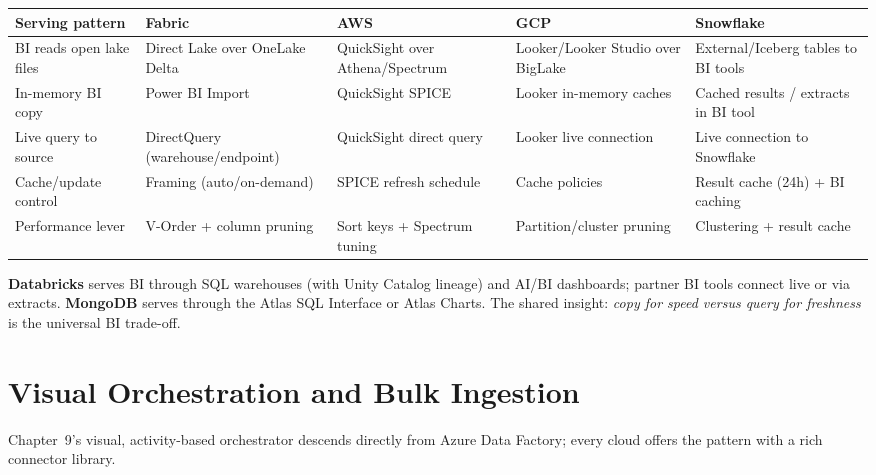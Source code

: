 \begin{center}
\footnotesize
\begin{tabular}{@{}p{2.8cm}p{3.2cm}p{3.2cm}p{3.2cm}p{3.2cm}@{}}
\toprule
\textbf{Serving pattern} & \textbf{Fabric} & \textbf{AWS} & \textbf{GCP} & \textbf{Snowflake} \\
\midrule
BI reads open lake files & Direct Lake over OneLake Delta & QuickSight over Athena/Spectrum & Looker/Looker Studio over BigLake & External/Iceberg tables to BI tools \\
In-memory BI copy & Power BI Import & QuickSight SPICE & Looker in-memory caches & Cached results / extracts in BI tool \\
Live query to source & DirectQuery (warehouse/endpoint) & QuickSight direct query & Looker live connection & Live connection to Snowflake \\
Cache/update control & Framing (auto/on-demand) & SPICE refresh schedule & Cache policies & Result cache (24h) + BI caching \\
Performance lever & V-Order + column pruning & Sort keys + Spectrum tuning & Partition/cluster pruning & Clustering + result cache \\
\bottomrule
\end{tabular}
\end{center}

\noindent \textbf{Databricks} serves BI through SQL warehouses (with Unity Catalog lineage) and
AI/BI dashboards; partner BI tools connect live or via extracts. \textbf{MongoDB} serves through
the Atlas SQL Interface or Atlas Charts. The shared insight: \emph{copy for speed versus query
for freshness} is the universal BI trade-off.

\section{Visual Orchestration and Bulk Ingestion}
%
Chapter~9's visual, activity-based orchestrator descends directly from Azure Data Factory; every
cloud offers the pattern with a rich connector library.


